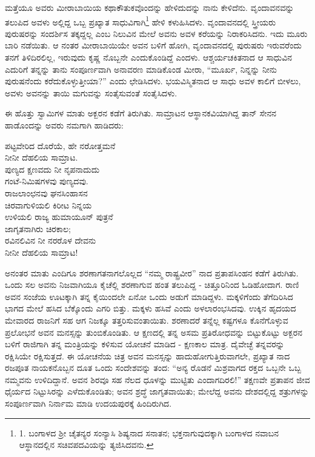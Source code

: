 ಮತ್ತೆಯೂ ಅವರು ಮೀರಾಬಾಯಿಯ ಕಥಾಕೌತುಕವೊಂದನ್ನು ಹೇಳಿದುದನ್ನು ನಾನು ಕೇಳಿದೆನು. ವೃಂದಾವನವನ್ನು ತಲುಪಿದ ಅವಳು ಅಲ್ಲಿದ್ದ ಒಬ್ಬ ಪ್ರಖ್ಯಾತ ಸಾಧುವಿಗಾಗಿ\footnote{1. ಬಂಗಾಳದ ಶ‍್ರೀ ಚೈತನ್ಯರ ಸಂನ್ಯಾಸಿ ಶಿಷ್ಯನಾದ ಸನಾತನ; ಭಕ್ತನಾಗುವುದಕ್ಕಾಗಿ ಬಂಗಾಳದ ನವಾಬನ ಆಸ್ಥಾನದಲ್ಲಿನ ಸಚಿವಪದವಿಯನ್ನು ತ್ಯಜಿಸಿದವನು.} ಹೇಳಿ ಕಳುಹಿಸಿದಳು. ವೃಂದಾವನದಲ್ಲಿ ಸ್ತ್ರೀಯರು ಪುರುಷರನ್ನು ಸಂದರ್ಶಿಸ ತಕ್ಕದ್ದಲ್ಲ ಎಂಬ ನಿಲುವಿನ ಮೇಲೆ ಅವನು ಅವಳ ಕರೆಯನ್ನು ನಿರಾಕರಿಸಿದನು. ಇದು ಮೂರು ಬಾರಿ ನಡೆಯಿತು. ಆ ನಂತರ ಮೀರಾಬಾಯಿಯೇ ಅವನ ಬಳಿಗೆ ಹೋಗಿ, ವೃಂದಾವನದಲ್ಲಿ ಪುರುಷರು ಇರುವರೆಂದು ತನಗೆ ತಿಳಿದಿರಲಿಲ್ಲ, ಇರುವುದು ಕೃಷ್ಣ ನೊಬ್ಬನೇ ಎಂದುಕೊಂಡಿದ್ದೆ ಎಂದಳು. ಆಶ್ಚರ್ಯಚಕಿತನಾದ ಆ ಸಾಧುವಿನ ಎದುರಿಗೆ ತನ್ನನ್ನು ತಾನು ಸಂಪೂರ್ಣವಾಗಿ ಅನಾವರಣ ಮಾಡಿಕೊಂಡ ಮೀರಾ, “ಮೂರ್ಖ, ನಿನ್ನನ್ನು ನೀನು ಪುರುಷನೆಂದು ಕರೆದುಕೊಳ್ಳುತ್ತೀಯಾ?” ಎಂದು ಛೇಡಿಸಿದಳು. ಭಯವಿಸ್ಮಿತನಾದ ಆ ಸಾಧು ಅವಳ ಕಾಲಿಗೆ ಬೀಳಲು, ಅವಳು ಅವನನ್ನು ತಾಯಿ ಮಗುವನ್ನು ಸಂತೈಸುವಂತೆ ಸಂತೈಸಿದಳು.

ಈ ಹೊತ್ತು ಸ್ವಾಮಿಗಳ ಮಾತು ಅಕ್ಬರನ ಕಡೆಗೆ ತಿರುಗಿತು. ಸಾಮ್ರಾಟನ ಆಸ್ಥಾನಕವಿಯಾಗಿದ್ದ ತಾನ್ ಸೇನನ ಹಾಡೊಂದನ್ನು ಅವರು ನಮಗಾಗಿ ಹಾಡಿದರು:

\begin{myquote}
ಪಟ್ಟವೇರಿದ ದೊರೆಯೆ, ಹೇ ನರೋತ್ತಮನೆ\\ನೀನೀ ದೆಹಲಿಯ ಸಾಮ್ರಾಟ.\\ಪುಣ್ಯದ ಕ್ಷಣವದು ನೀ ನೃಪನಾದುದು\\ಗಂಟೆ-ನಿಮಿಷಗಳವು ಪುಣ್ಯದವು.\\ರಾಜಲಾಂಛನವು ಘನಸಿಂಹಾಸನ\\ಚಿರವಾಗುಳಿಯಲಿ ಕಿರೀಟ ನಿನ್ನಯ\\ಉಳಿಯಲಿ ರಾಜ್ಯ ಹುಮಾಯೂನ್ ಪುತ್ರನೆ\\ಜಾಗೃತನಾಗಿರು ಚಿರಕಾಲ;\\ರವಿನಲಿವಿನ ನೀ ನರರೊಳ ದೇವನು\\ನೀನೀ ದೆಹಲಿಯ ಸಾಮ್ರಾಟ!
\end{myquote}

ಅನಂತರ ಮಾತು ಎಂದಿಗೂ ಶರಣಾಗತನಾಗಲೊಲ್ಲದ “ನಮ್ಮ ರಾಷ್ಟ್ರವೀರ” ನಾದ ಪ್ರತಾಪಸಿಂಹನ ಕಡೆಗೆ ತಿರುಗಿತು. ಒಂದು ಸಲ ಅವನು ನಿಜವಾಗಿಯೂ ಕೈಚೆಲ್ಲಿ ಶರಣಾಗುವ ಹಂತ ತಲುಪಿದ್ದ - ಚಿತ್ತೂರಿನಿಂದ ಓಡಿಹೋದಾಗ. ರಾಣಿ ಅವನ ಸಂಜೆಯ ಊಟಕ್ಕಾಗಿ ತನ್ನ ಕೈಯಿಂದಲೇ ಏನೋ ಒಂದು ಅಡುಗೆ ಮಾಡಿದ್ದಳು. ಮಕ್ಕಳಿಗೆಂದು ತೆಗೆದಿರಿಸಿದ ಭಾಗದ ಮೇಲೆ ಹಸಿದ ಬೆಕ್ಕೊಂದು ಎಗರಿ ಬಿತ್ತು. ಮಕ್ಕಳು ಹಸಿವೆ ಎಂದು ಅಳಲಾರಂಭಸಿದವು. ಉಕ್ಕಿನ ಹೃದಯದ ಮೇವಾರದ ರಾಜನಿಗೆ ಸಹ ಆಗ ನಿಜಕ್ಕೂ ತತ್ತರಿಸುವಂತಾಯಿತು. ಶರಣಾದರೆ ತನ್ನೆಲ್ಲ ಕಷ್ಟಗಳೂ ಕೊನೆಗೊಳ್ಳುವ ಪ್ರಲೋಭನೆ ಅವನ ಮನಸ್ಸನ್ನು ತುಂಬಿಕೊಂಡಿತು. ಆ ಕ್ಷಣದಲ್ಲಿ ತನ್ನ ಅಸಮ ಪ್ರತಿರೋಧವನ್ನು ಬಿಟ್ಟುಕೊಟ್ಟು ಅಕ್ಬರನ ಬಳಿಗೆ ರಾಜಿಗಾಗಿ ತನ್ನ ಮಂತ್ರಿಯನ್ನು ಕಳಿಸುವ ಯೋಚನೆ ಮಾಡಿದ - ಕ್ಷಣಕಾಲ ಮಾತ್ರ. ದೈವೇಚ್ಛೆ ತನ್ನವರನ್ನು ರಕ್ಷಿಸಿಯೇ ರಕ್ಷಿಸುತ್ತದೆ. ಈ ಯೋಚನೆಯ ಚಿತ್ರ ಅವನ ಮನಸ್ಸನ್ನು ಹಾದುಹೋಗುತ್ತಿರುವಾಗಲೇ, ಪ್ರಖ್ಯಾತ ನಾದ ರಜಪೂತ ನಾಯಕನೊಬ್ಬನ ದೂತ ಒಂದು ಸಂದೇಶವನ್ನು ತಂದ: “ಅನ್ಯ ರೊಡನೆ ಮಿಶ್ರವಾಗದ ರಕ್ತದ ಒಬ್ಬನೇ ಒಬ್ಬ ನಮ್ಮವನು ಉಳಿದಿದ್ದಾನೆ. ಅವನ ಶಿರವೂ ಸಹ ನೆಲದ ಧೂಳನ್ನು ಮುಟ್ಟಿತು ಎಂದಾಗದಿರಲಿ!” ತಕ್ಷಣವೇ ಪ್ರತಾಪನ ಜೀವ ಧೈರ್ಯದ ನಿಟ್ಟುಸಿರನ್ನು ಎಳೆದುಕೊಂಡಿತು; ಅವನ ಶ್ರದ್ಧೆ ಜಾಗೃತವಾಯಿತು; ಮೇಲೆದ್ದ ಅವನು ದೇಶದಲ್ಲಿದ್ದ ಶತ್ರುಗಳನ್ನು ಸಂಪೂರ್ಣವಾಗಿ ನಿರ್ನಾಮ ಮಾಡಿ ಉದಯಪುರಕ್ಕೆ ಹಿಂದಿರುಗಿದ.

